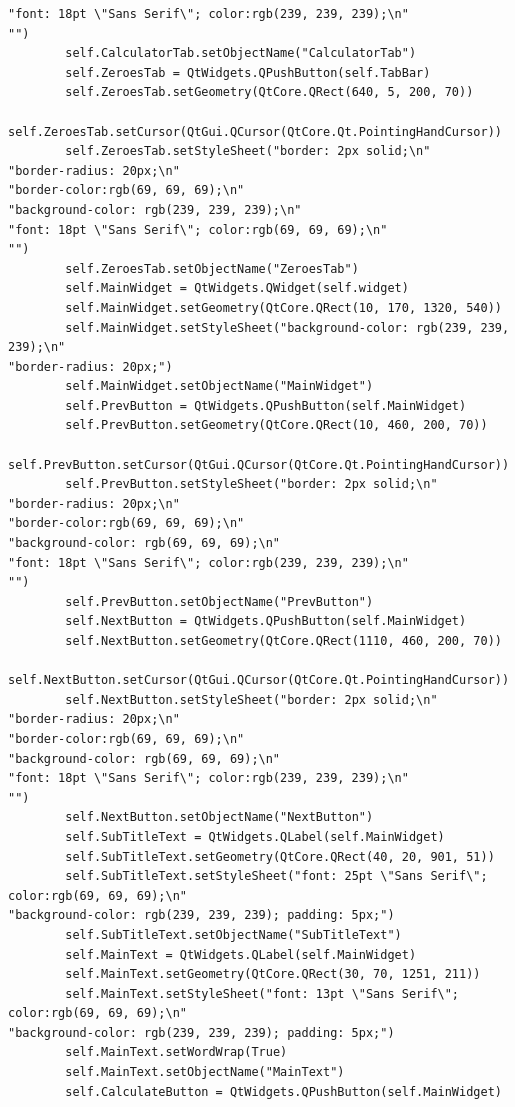 \documentclass{article}
\begin{document}
\begin{lstlisting}
"font: 18pt \"Sans Serif\"; color:rgb(239, 239, 239);\n"
"")
        self.CalculatorTab.setObjectName("CalculatorTab")
        self.ZeroesTab = QtWidgets.QPushButton(self.TabBar)
        self.ZeroesTab.setGeometry(QtCore.QRect(640, 5, 200, 70))
        self.ZeroesTab.setCursor(QtGui.QCursor(QtCore.Qt.PointingHandCursor))
        self.ZeroesTab.setStyleSheet("border: 2px solid;\n"
"border-radius: 20px;\n"
"border-color:rgb(69, 69, 69);\n"
"background-color: rgb(239, 239, 239);\n"
"font: 18pt \"Sans Serif\"; color:rgb(69, 69, 69);\n"
"")
        self.ZeroesTab.setObjectName("ZeroesTab")
        self.MainWidget = QtWidgets.QWidget(self.widget)
        self.MainWidget.setGeometry(QtCore.QRect(10, 170, 1320, 540))
        self.MainWidget.setStyleSheet("background-color: rgb(239, 239, 239);\n"
"border-radius: 20px;")
        self.MainWidget.setObjectName("MainWidget")
        self.PrevButton = QtWidgets.QPushButton(self.MainWidget)
        self.PrevButton.setGeometry(QtCore.QRect(10, 460, 200, 70))
        self.PrevButton.setCursor(QtGui.QCursor(QtCore.Qt.PointingHandCursor))
        self.PrevButton.setStyleSheet("border: 2px solid;\n"
"border-radius: 20px;\n"
"border-color:rgb(69, 69, 69);\n"
"background-color: rgb(69, 69, 69);\n"
"font: 18pt \"Sans Serif\"; color:rgb(239, 239, 239);\n"
"")
        self.PrevButton.setObjectName("PrevButton")
        self.NextButton = QtWidgets.QPushButton(self.MainWidget)
        self.NextButton.setGeometry(QtCore.QRect(1110, 460, 200, 70))
        self.NextButton.setCursor(QtGui.QCursor(QtCore.Qt.PointingHandCursor))
        self.NextButton.setStyleSheet("border: 2px solid;\n"
"border-radius: 20px;\n"
"border-color:rgb(69, 69, 69);\n"
"background-color: rgb(69, 69, 69);\n"
"font: 18pt \"Sans Serif\"; color:rgb(239, 239, 239);\n"
"")
        self.NextButton.setObjectName("NextButton")
        self.SubTitleText = QtWidgets.QLabel(self.MainWidget)
        self.SubTitleText.setGeometry(QtCore.QRect(40, 20, 901, 51))
        self.SubTitleText.setStyleSheet("font: 25pt \"Sans Serif\"; color:rgb(69, 69, 69);\n"
"background-color: rgb(239, 239, 239); padding: 5px;")
        self.SubTitleText.setObjectName("SubTitleText")
        self.MainText = QtWidgets.QLabel(self.MainWidget)
        self.MainText.setGeometry(QtCore.QRect(30, 70, 1251, 211))
        self.MainText.setStyleSheet("font: 13pt \"Sans Serif\"; color:rgb(69, 69, 69);\n"
"background-color: rgb(239, 239, 239); padding: 5px;")
        self.MainText.setWordWrap(True)
        self.MainText.setObjectName("MainText")
        self.CalculateButton = QtWidgets.QPushButton(self.MainWidget)

\end{lstlisting}
\end{document}
